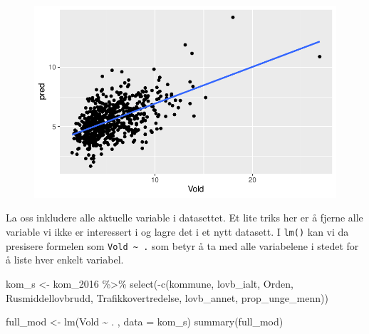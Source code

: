 \documentclass[
  letterpaper,
  DIV=11,
  numbers=noendperiod]{scrreprt}
\newenvironment{Shaded}{\begin{snugshade}}{\end{snugshade}}
\newcommand{\AttributeTok}[1]{\textcolor[rgb]{0.40,0.45,0.13}{#1}}
\newcommand{\FunctionTok}[1]{\textcolor[rgb]{0.28,0.35,0.67}{#1}}
\newcommand{\NormalTok}[1]{\textcolor[rgb]{0.00,0.23,0.31}{#1}}
\newcommand{\OtherTok}[1]{\textcolor[rgb]{0.00,0.23,0.31}{#1}}
\newcommand{\SpecialCharTok}[1]{\textcolor[rgb]{0.37,0.37,0.37}{#1}}
\theoremstyle{definition}
\theoremstyle{remark}
\begin{document}
\begin{figure}[H]

{\centering \includegraphics{./linear_regresjon_files/figure-pdf/unnamed-chunk-11-1.pdf}

}

\end{figure}

La oss inkludere alle aktuelle variable i datasettet. Et lite triks her
er å fjerne alle variable vi ikke er interessert i og lagre det i et
nytt datasett. I \texttt{lm()} kan vi da presisere formelen som
\texttt{Vold\ \textasciitilde{}\ .} som betyr å ta med alle variabelene
i stedet for å liste hver enkelt variabel.

\begin{Shaded}
\begin{Highlighting}[]
\NormalTok{kom\_s }\OtherTok{\textless{}{-}}\NormalTok{ kom\_2016 }\SpecialCharTok{\%\textgreater{}\%} 
  \FunctionTok{select}\NormalTok{(}\SpecialCharTok{{-}}\FunctionTok{c}\NormalTok{(kommune, lovb\_ialt, Orden,  }
\NormalTok{            Rusmiddellovbrudd, Trafikkovertredelse, }
\NormalTok{            lovb\_annet, prop\_unge\_menn))}

\NormalTok{full\_mod }\OtherTok{\textless{}{-}} \FunctionTok{lm}\NormalTok{(Vold }\SpecialCharTok{\textasciitilde{}}\NormalTok{ . , }\AttributeTok{data =}\NormalTok{ kom\_s)}
\FunctionTok{summary}\NormalTok{(full\_mod)}
\end{Highlighting}
\end{Shaded}
\end{document}
